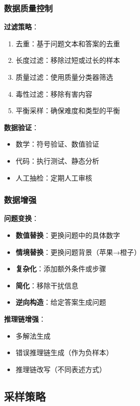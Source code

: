 \documentclass[12pt,a4paper]{article}
\begin{document}
\subsubsection{数据质量控制}

\textbf{过滤策略}：
\begin{enumerate}
    \item 去重：基于问题文本和答案的去重
    \item 长度过滤：移除过短或过长的样本
    \item 质量过滤：使用质量分类器筛选
    \item 毒性过滤：移除有害内容
    \item 平衡采样：确保难度和类型的平衡
\end{enumerate}

\textbf{数据验证}：
\begin{itemize}
    \item 数学：符号验证、数值验证
    \item 代码：执行测试、静态分析
    \item 人工抽检：定期人工审核
\end{itemize}

\subsubsection{数据增强}

\textbf{问题变换}：
\begin{itemize}
    \item \textbf{数值替换}：更换问题中的具体数字
    \item \textbf{情境替换}：更换问题背景（苹果→橙子）
    \item \textbf{复杂化}：添加额外条件或步骤
    \item \textbf{简化}：移除干扰信息
    \item \textbf{逆向构造}：给定答案生成问题
\end{itemize}

\textbf{推理链增强}：
\begin{itemize}
    \item 多解法生成
    \item 错误推理链生成（作为负样本）
    \item 推理链改写（不同表述方式）
\end{itemize}

\subsection{采样策略}
\end{document}
